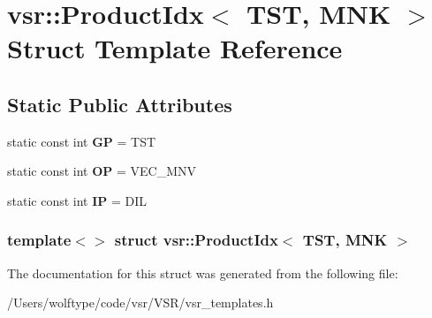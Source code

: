 \hypertarget{structvsr_1_1_product_idx_3_01_t_s_t_00_01_m_n_k_01_4}{\section{vsr\-:\-:Product\-Idx$<$ T\-S\-T, M\-N\-K $>$ Struct Template Reference}
\label{structvsr_1_1_product_idx_3_01_t_s_t_00_01_m_n_k_01_4}
}
\subsection*{Static Public Attributes}
\begin{DoxyCompactItemize}
\item 
\hypertarget{structvsr_1_1_product_idx_3_01_t_s_t_00_01_m_n_k_01_4_a2f9e1d3d70faff8adbdecb67230481da}{static const int {\bfseries G\-P} = T\-S\-T}\label{structvsr_1_1_product_idx_3_01_t_s_t_00_01_m_n_k_01_4_a2f9e1d3d70faff8adbdecb67230481da}

\item 
\hypertarget{structvsr_1_1_product_idx_3_01_t_s_t_00_01_m_n_k_01_4_ae78c8e33622aa8d143ef5dbc3f8dd712}{static const int {\bfseries O\-P} = V\-E\-C\-\_\-\-M\-N\-V}\label{structvsr_1_1_product_idx_3_01_t_s_t_00_01_m_n_k_01_4_ae78c8e33622aa8d143ef5dbc3f8dd712}

\item 
\hypertarget{structvsr_1_1_product_idx_3_01_t_s_t_00_01_m_n_k_01_4_a696dc91ac399379861dd2139d2d0468d}{static const int {\bfseries I\-P} = D\-I\-L}\label{structvsr_1_1_product_idx_3_01_t_s_t_00_01_m_n_k_01_4_a696dc91ac399379861dd2139d2d0468d}

\end{DoxyCompactItemize}
\subsubsection*{template$<$$>$ struct vsr\-::\-Product\-Idx$<$ T\-S\-T, M\-N\-K $>$}



The documentation for this struct was generated from the following file\-:\begin{DoxyCompactItemize}
\item 
/\-Users/wolftype/code/vsr/\-V\-S\-R/vsr\-\_\-templates.\-h\end{DoxyCompactItemize}
